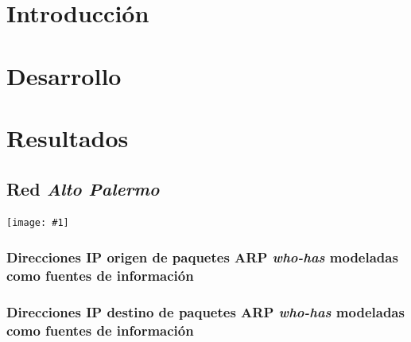 \documentclass[a4paper, 10pt, twoside]{article}
\newcommand{\grafo}[1]{
  \texttt{[image: \#1]}
}
\begin{document}
\newpage




\section{Introducción}




\section{Desarrollo}





\section{Resultados}


\subsection{Red \emph{Alto Palermo}}

\grafo{altopalermo}


\subsubsection{Direcciones IP origen de paquetes ARP \emph{who-has} modeladas como fuentes de información}




\subsubsection{Direcciones IP destino de paquetes ARP \emph{who-has} modeladas como fuentes de información}

\end{document}
